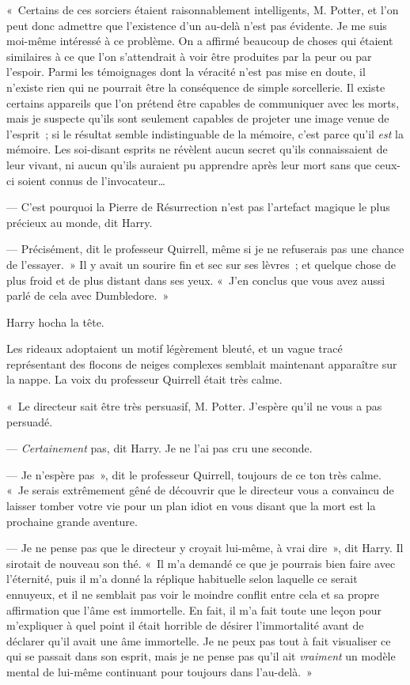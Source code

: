 «~Certains de ces sorciers étaient raisonnablement intelligents, M. Potter, et l'on peut donc admettre que l'existence d'un au-delà n'est pas évidente.
Je me suis moi-même intéressé à ce problème.
On a affirmé beaucoup de choses qui étaient similaires à ce que l'on s'attendrait à voir être produites par la peur ou par l'espoir.
Parmi les témoignages dont la véracité n'est pas mise en doute, il n'existe rien qui ne pourrait être la conséquence de simple sorcellerie.
Il existe certains appareils que l'on prétend être capables de communiquer avec les morts, mais je suspecte qu'ils sont seulement capables de projeter une image venue de l'esprit~; si le résultat semble indistinguable de la mémoire, c'est parce qu'il \emph{est} la mémoire.
Les soi-disant esprits ne révèlent aucun secret qu'ils connaissaient de leur vivant, ni aucun qu'ils auraient pu apprendre après leur mort sans que ceux-ci soient connus de l'invocateur…

--- C'est pourquoi la Pierre de Résurrection n'est pas l'artefact magique le plus précieux au monde, dit Harry.

--- Précisément, dit le professeur Quirrell, même si je ne refuserais pas une chance de l'essayer.~»
Il y avait un sourire fin et sec sur ses lèvres~; et quelque chose de plus froid et de plus distant dans ses yeux.
«~J'en conclus que vous avez aussi parlé de cela avec Dumbledore.~»

Harry hocha la tête.

Les rideaux adoptaient un motif légèrement bleuté, et un vague tracé représentant des flocons de neiges complexes semblait maintenant apparaître sur la nappe.
La voix du professeur Quirrell était très calme.

«~Le directeur sait être très persuasif, M. Potter.
J'espère qu'il ne vous a pas persuadé.

--- \emph{Certainement} pas, dit Harry.
Je ne l'ai pas cru une seconde.

--- Je n'espère pas~», dit le professeur Quirrell, toujours de ce ton très calme.
«~Je serais extrêmement gêné de découvrir que le directeur vous a convaincu de laisser tomber votre vie pour un plan idiot en vous disant que la mort est la prochaine grande aventure.

--- Je ne pense pas que le directeur y croyait lui-même, à vrai dire~», dit Harry.
Il sirotait de nouveau son thé.
«~Il m'a demandé ce que je pourrais bien faire avec l'éternité, puis il m'a donné la réplique habituelle selon laquelle ce serait ennuyeux, et il ne semblait pas voir le moindre conflit entre cela et sa propre affirmation que l'âme est immortelle.
En fait, il m'a fait toute une leçon pour m'expliquer à quel point il était horrible de désirer l'immortalité avant de déclarer qu'il avait une âme immortelle.
Je ne peux pas tout à fait visualiser ce qui se passait dans son esprit, mais je ne pense pas qu'il ait \emph{vraiment} un modèle mental de lui-même continuant pour toujours dans l'au-delà.~»

